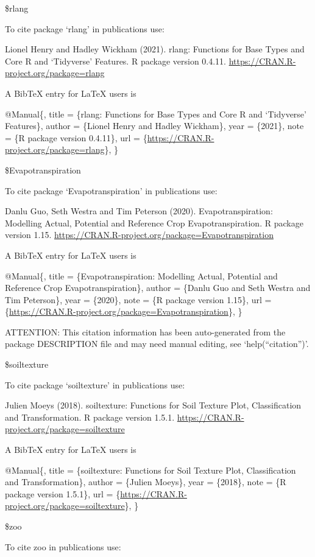 \documentclass[
]{article}
\begin{document}
\$rlang

To cite package `rlang' in publications use:

Lionel Henry and Hadley Wickham (2021). rlang: Functions for Base Types
and Core R and `Tidyverse' Features. R package version 0.4.11.
\url{https://CRAN.R-project.org/package=rlang}

A BibTeX entry for LaTeX users is

@Manual\{, title = \{rlang: Functions for Base Types and Core R and
`Tidyverse' Features\}, author = \{Lionel Henry and Hadley Wickham\},
year = \{2021\}, note = \{R package version 0.4.11\}, url =
\{\url{https://CRAN.R-project.org/package=rlang}\}, \}

\$Evapotranspiration

To cite package `Evapotranspiration' in publications use:

Danlu Guo, Seth Westra and Tim Peterson (2020). Evapotranspiration:
Modelling Actual, Potential and Reference Crop Evapotranspiration. R
package version 1.15.
\url{https://CRAN.R-project.org/package=Evapotranspiration}

A BibTeX entry for LaTeX users is

@Manual\{, title = \{Evapotranspiration: Modelling Actual, Potential and
Reference Crop Evapotranspiration\}, author = \{Danlu Guo and Seth
Westra and Tim Peterson\}, year = \{2020\}, note = \{R package version
1.15\}, url =
\{\url{https://CRAN.R-project.org/package=Evapotranspiration}\}, \}

ATTENTION: This citation information has been auto-generated from the
package DESCRIPTION file and may need manual editing, see
`help(``citation'')'.

\$soiltexture

To cite package `soiltexture' in publications use:

Julien Moeys (2018). soiltexture: Functions for Soil Texture Plot,
Classification and Transformation. R package version 1.5.1.
\url{https://CRAN.R-project.org/package=soiltexture}

A BibTeX entry for LaTeX users is

@Manual\{, title = \{soiltexture: Functions for Soil Texture Plot,
Classification and Transformation\}, author = \{Julien Moeys\}, year =
\{2018\}, note = \{R package version 1.5.1\}, url =
\{\url{https://CRAN.R-project.org/package=soiltexture}\}, \}

\$zoo

To cite zoo in publications use:
\end{document}
